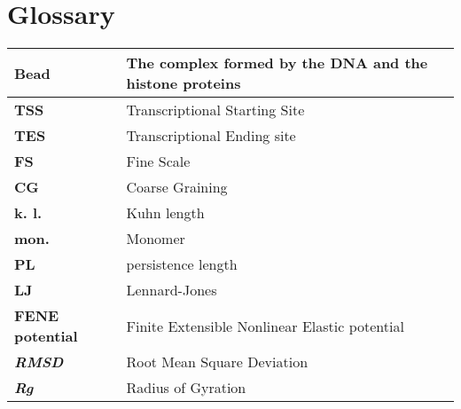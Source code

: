 \section{Glossary} \label{chap: term explanation}

\small{\begin{table}[H]
\begin{tabular}{|l|l|}
\hline
\textbf{Bead} & The complex formed by the DNA and the histone proteins \\
\hline
\textbf{TSS} & Transcriptional Starting Site \\
\hline
\textbf{TES} & Transcriptional Ending site \\
\hline
\textbf{FS} & Fine Scale \\
\hline
\textbf{CG} & Coarse Graining \\
\hline
\textbf{k. l.} & Kuhn length\\
\hline
\textbf{mon.} & Monomer\\
\hline
\textbf{PL} & persistence length\\
\hline
\textbf{LJ} & Lennard-Jones\\
\hline
\textbf{FENE potential} & Finite Extensible Nonlinear Elastic potential\\
\hline
\textbf{\textit{RMSD}} & Root Mean Square Deviation\\
\hline
\textbf{\textit{Rg}} & Radius of Gyration\\
\hline
\end{tabular}
\end{table}}